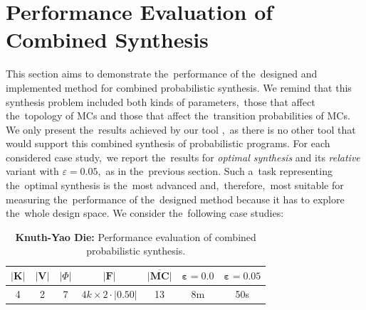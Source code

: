 \section{Performance Evaluation of Combined Synthesis}
This section aims to demonstrate the~performance of the~designed and implemented method for combined probabilistic synthesis.
We remind that this synthesis problem included both kinds of parameters,~those that affect the~topology of MCs and those that affect the~transition probabilities of MCs.
We only present the~results achieved by our tool \toolname{},~as there is no other tool that would support this combined synthesis of probabilistic programs.
For each considered case study,~we report the~results for \textit{optimal synthesis} and its \textit{relative} variant with $\varepsilon = 0.05$,~as in the~previous section.
Such a~task representing the~optimal synthesis is the~most advanced and,~therefore,~most suitable for measuring the~performance of the~designed method because it has to explore the~whole design space.
We consider the~following case studies:

\begin{table}[h!]
\centering
\begin{tabular}{|c|c|c|c|c|c|c|}
\hline
$\lvert \mathbf{K} \rvert$ & $\lvert \mathbf{V} \rvert$ & $\lvert \varPhi \rvert$ & $\lvert \mathcal{\mathbf{F}} \rvert$ & $\overline{\mathbf{\lvert MC \rvert}}$ & $\mathbf{\varepsilon = 0.0}$ & $\mathbf{\varepsilon = 0.05}$ \\ \hline
4 & 2 & 7 & $4k \times 2 \cdot \lvert 0.50 \rvert$ & 13 & 8m & 50s \\ \hline
\end{tabular}
\caption{\textbf{Knuth-Yao Die:} Performance evaluation of combined probabilistic synthesis.}
\end{table}


